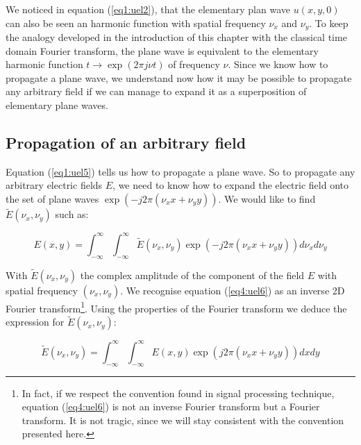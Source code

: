 We noticed in equation (\ref{eq1:uel2}), that the elementary plan wave $u(x,y,0)$ can also be seen an harmonic function with spatial frequency $\nu_x$ and $\nu_y$. To keep the analogy developed in the introduction of this chapter with the classical time domain Fourier transform, the plane wave is equivalent to the elementary harmonic function $t\rightarrow \exp(2\pi j \nu t)$ of frequency $\nu$. Since we know how to propagate a plane wave, we understand now how it may be possible to propagate any arbitrary field if we can manage to expand it as a superposition of elementary plane waves.

\subsection{Propagation of an arbitrary field}

Equation (\ref{eq1:uel5}) tells us how to propagate a plane wave. So to propagate any arbitrary electric fields $E$, we need to know how to expand the electric field onto the set of plane waves $\exp(-j 2 \pi (\nu_x x + \nu_y y))$. We would like to find $\widetilde{E}(\nu_x,\nu_y)$ such as:

\begin{equation}
 E(x,y) = \int_{-\infty}^{\infty} \int_{-\infty}^{\infty} \widetilde{E}(\nu_x,\nu_y) \exp(-j 2\pi (\nu_x x + \nu_y y)) d\nu_x d\nu_y
\label{eq4:uel6}
\end{equation}

With $\widetilde{E}(\nu_x,\nu_y)$ the complex amplitude of the component of the field $E$ with spatial frequency $(\nu_x,\nu_y)$. We recognise equation (\ref{eq4:uel6}) as an inverse 2D Fourier transform\footnote{In fact, if we respect the convention found in signal processing technique, equation (\ref{eq4:uel6}) is not an inverse Fourier transform but a Fourier transform\cite{Sig_proc}. It is not tragic, since we will stay consistent with the convention presented here.}. Using the properties of the Fourier transform\cite{Fourier_trans} we deduce the expression for $\widetilde{E}(\nu_x,\nu_y)$:

\begin{equation}
  \widetilde{E}(\nu_x,\nu_y) = \int_{-\infty}^{\infty} \int_{-\infty}^{\infty} E(x,y) \exp(j 2\pi (\nu_x x + \nu_y y)) dx dy
\label{eq4:uel7}
\end{equation}


